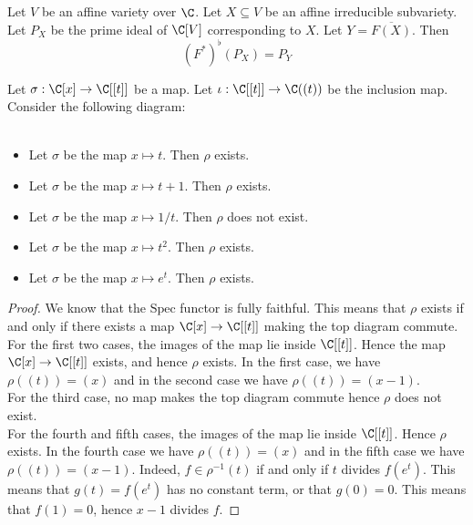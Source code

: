 \documentclass[a4paper]{article}
\begin{document}
\begin{prp}{}{} Let $V$ be an affine variety over $\C$. Let $X\subseteq V$ be an affine irreducible subvariety. Let $P_X$ be the prime ideal of $\C[V]$ corresponding to $X$. Let $Y=\overline{F(X)}$. Then $$(F^\ast)^\flat(P_X)=P_Y$$
\end{prp}

\begin{eg}{}{} Let $\sigma:\C[x]\to\C[[t]]$ be a map. Let $\iota:\C[[t]]\to\C((t))$ be the inclusion map. Consider the following diagram: \\
\\
\begin{itemize}
\item Let $\sigma$ be the map $x\mapsto t$. Then $\rho$ exists. 
\item Let $\sigma$ be the map $x\mapsto t+1$. Then $\rho$ exists. 
\item Let $\sigma$ be the map $x\mapsto 1/t$. Then $\rho$ does not exist. 
\item Let $\sigma$ be the map $x\mapsto t^2$. Then $\rho$ exists. 
\item Let $\sigma$ be the map $x\mapsto e^t$. Then $\rho$ exists. 
\end{itemize} 
\begin{proof}
We know that the $\text{Spec}$ functor is fully faithful. This means that $\rho$ exists if and only if there exists a map $\C[x]\to\C[[t]]$ making the top diagram commute. \\

For the first two cases, the images of the map lie inside $\C[[t]]$. Hence the map $\C[x]\to\C[[t]]$ exists, and hence $\rho$ exists. In the first case, we have $\rho((t))=(x)$ and in the second case we have $\rho((t))=(x-1)$. \\

For the third case, no map makes the top diagram commute hence $\rho$ does not exist. \\

For the fourth and fifth cases, the images of the map lie inside $\C[[t]]$. Hence $\rho$ exists. In the fourth case we have $\rho((t))=(x)$ and in the fifth case we have $\rho((t))=(x-1)$. Indeed, $f\in\rho^{-1}(t)$ if and only if $t$ divides $f(e^t)$. This means that $g(t)=f(e^t)$ has no constant term, or that $g(0)=0$. This means that $f(1)=0$, hence $x-1$ divides $f$. 
\end{proof}
\end{eg}
\end{document}
